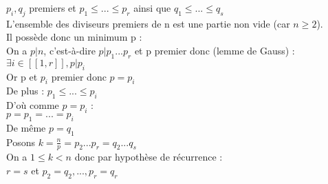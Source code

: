 \documentclass{article}
\begin{document}
$p_i,q_j$ premiers et $p_1 \leq ... \leq p_r$ ainsi que $q_1 \leq ... \leq q_s$ \\ 
L'ensemble des diviseurs premiers de n est une partie non vide (car $n \geq 2$). \\ 
Il possède donc un minimum p : \\ 
On a $p|n$, c'est-à-dire $p|p_1...p_r$ et p premier donc (lemme de Gauss) : \\ 
$\exists i \in [[1,r]],p|p_i$ \\ 
Or p et $p_i$ premier donc $p=p_i$ \\ 
De plus : $p_1 \leq ... \leq p_i$ \\ 
D'où comme $p=p_i$ : \\ 
$p=p_1=...=p_i$ \\ 
De même $p=q_1$ \\ 
Posons $k= \frac{n}{p}=p_2...p_r=q_2...q_s$ \\ 
On a $1 \leq k < n$ donc par hypothèse de récurrence : \\ 
$r=s$ et $p_2=q_2,...,p_r=q_r$
\end{document}
